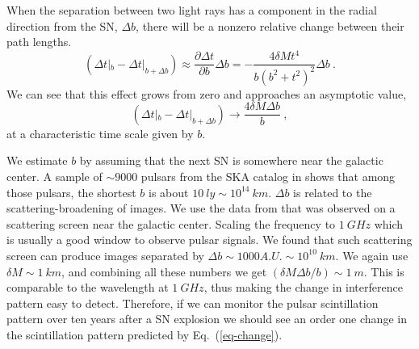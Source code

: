 \documentclass[aps,showpacs,twocolumn,floats,prd,superscriptaddress,nofootinbib]{revtex4-1}
\begin{document}
When the separation between two light rays has a component in the radial direction from the SN, $\Delta b$, there will be a nonzero relative change between their path lengths.
\begin{equation}
	(\Delta t|_b - \Delta t|_{b+\Delta b}) \approx 
	\frac{\partial \Delta t}{\partial b} \Delta b 
	= - \frac{4\delta Mt^4}{b(b^2 + t^2)^2} \Delta b~.
	\label{eq-change}
\end{equation}
We can see that this effect grows from zero and approaches an asymptotic value,
\begin{equation}
	(\Delta t|_b - \Delta t|_{b+\Delta b}) 
	\longrightarrow \frac{4\delta M \Delta b}{b}~,
\end{equation}
at a characteristic time scale given by $b$. 

We estimate $b$ by assuming that the next SN is somewhere near the galactic center. A sample of $\sim 9000$ pulsars from the SKA catalog in \cite{MSPpopulation} shows that among those pulsars, the shortest $b$ is about $10\ ly \sim 10^{14} \ km$. $\Delta b$ is related to the scattering-broadening of images. We use the data from \cite{BowBel13} that was observed on a scattering screen near the galactic center. Scaling the frequency to $1\ GHz$ which is usually a good window to observe pulsar signals. We found that such scattering screen can produce images separated by $\Delta b\sim 1000A.U. \sim 10^{10} \ km$. We again use $\delta M \sim 1 \ km$, and combining all these numbers we get $(\delta M \Delta b / b) \sim 1 \ m$. This is comparable to the wavelength at $1 \ GHz$, thus making the change in interference pattern easy to detect. Therefore, if we can monitor the pulsar scintillation pattern over ten years after a SN explosion we should see an order one change in the scintillation pattern predicted by Eq.~(\ref{eq-change}).

\onecolumngrid
\end{document}
